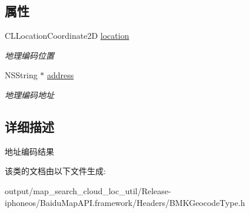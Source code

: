 \subsection*{属性}
\begin{DoxyCompactItemize}
\item 
\hypertarget{interface_b_m_k_geo_code_result_a4f2aaf9561f955a26979d388557ff31b}{}C\+L\+Location\+Coordinate2\+D \hyperlink{interface_b_m_k_geo_code_result_a4f2aaf9561f955a26979d388557ff31b}{location}\label{interface_b_m_k_geo_code_result_a4f2aaf9561f955a26979d388557ff31b}

\begin{DoxyCompactList}\small\item\em 地理编码位置 \end{DoxyCompactList}\item 
\hypertarget{interface_b_m_k_geo_code_result_a828c8d7063323c1540e9d66bdf0df22c}{}N\+S\+String $\ast$ \hyperlink{interface_b_m_k_geo_code_result_a828c8d7063323c1540e9d66bdf0df22c}{address}\label{interface_b_m_k_geo_code_result_a828c8d7063323c1540e9d66bdf0df22c}

\begin{DoxyCompactList}\small\item\em 地理编码地址 \end{DoxyCompactList}\end{DoxyCompactItemize}


\subsection{详细描述}
地址编码结果 

该类的文档由以下文件生成\+:\begin{DoxyCompactItemize}
\item 
output/map\+\_\+search\+\_\+cloud\+\_\+loc\+\_\+util/\+Release-\/iphoneos/\+Baidu\+Map\+A\+P\+I.\+framework/\+Headers/B\+M\+K\+Geocode\+Type.\+h\end{DoxyCompactItemize}
